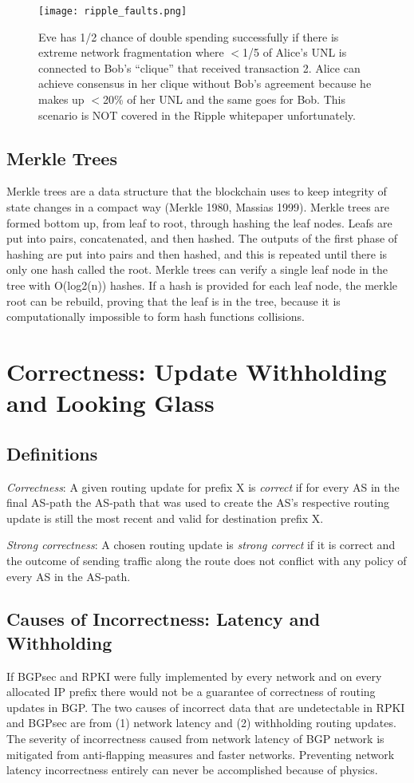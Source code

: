 \documentclass[letterpaper, 10 pt, conference]{ieeeconf}  %
\begin{document}
\begin{figure}[ht!]
	\centering
	\texttt{[image: ripple\_faults.png]}
    \caption{Eve has 1/2 chance of double spending successfully if there is extreme network fragmentation where $<$1/5 of Alice’s UNL is connected to Bob’s “clique” that received transaction 2. Alice can achieve consensus in her clique without Bob’s agreement because he makes up $<$20\% of her UNL and the same goes for Bob. This scenario is NOT covered in the Ripple whitepaper unfortunately.}
   	\end{figure}

\subsection{Merkle Trees}

Merkle trees are a data structure that the blockchain uses to keep integrity of state changes in a compact way (Merkle 1980, Massias 1999). Merkle trees are formed bottom up, from leaf to root, through hashing the leaf nodes. Leafs are put into pairs, concatenated, and then hashed. The outputs of the first phase of hashing are put into pairs and then hashed, and this is repeated until there is only one hash called the root. Merkle trees can verify a single leaf node in the tree with O(log2(n)) hashes. If a hash is provided for each leaf node, the merkle root can be rebuild, proving that the leaf is in the tree, because it is computationally impossible to form hash functions collisions. 


\section{Correctness: Update Withholding and Looking Glass}

\subsection{Definitions}
\textit{Correctness}: A given routing update for prefix X is \textit{correct} if for every AS in the final AS-path the AS-path that was used to create the AS’s respective routing update is still the most recent and valid for destination prefix X.

\textit{Strong correctness}: A chosen routing update is \textit{strong correct} if it is correct and the outcome of sending traffic along the route does not conflict with any policy of every AS in the AS-path. 

\subsection{Causes of Incorrectness: Latency and Withholding}
If BGPsec and RPKI were fully implemented by every network and on every allocated IP prefix there would not be a guarantee of correctness of routing updates in BGP. The two causes of incorrect data that are undetectable in RPKI and BGPsec are from (1) network latency and (2) withholding routing updates. The severity of incorrectness caused from network latency of BGP network is mitigated from anti-flapping measures and faster networks. Preventing network latency incorrectness entirely can never be accomplished because of physics.
\end{document}

